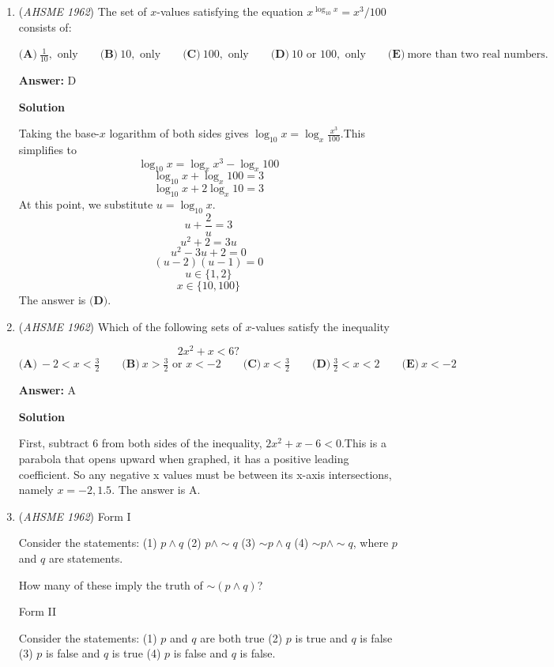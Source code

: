 \begin{enumerate}
 


	\item (\textit{AHSME 1962}) The set of $x$-values satisfying the equation $x^{\log_{10} x} = x^3/100$ consists of:


 $\textbf{(A)}\ \frac{1}{10},\text{ only} \qquad  \textbf{(B)}\ 10,\text{ only} \qquad  \textbf{(C)}\ 100,\text{ only} \qquad  \textbf{(D)}\ 10 \text{ or } 100,\text{ only} \qquad  \textbf{(E)}\ \text{more than two real numbers.}$

 \textbf{Answer: }D



\textbf{Solution}

Taking the base-$x$ logarithm of both sides gives $\log_{10}x=\log_x\frac{x^3}{100}$.This simplifies to 
 \[\log_{10}x=\log_x{x^3} - \log_x{100}\]
 \[\log_{10}x+\log_x{100}=3\]
 \[\log_{10}x+2 \log_x{10}=3\]At this point, we substitute $u=\log_{10}x$.
 \[u+\frac2u=3\]
 \[u^2+2=3u\]
 \[u^2-3u+2=0\]
 \[(u-2)(u-1)=0\]
 \[u\in\{1, 2\}\]
 \[x\in\{10, 100\}\]The answer is $\boxed{\textbf{(D)}}$.

 


	\item (\textit{AHSME 1962}) Which of the following sets of $x$-values satisfy the inequality

 \[2x^2 + x < 6?\]
$\textbf{(A)}\ -2 < x < \frac{3}{2} \qquad  \textbf{(B)}\ x > \frac{3}{2} \text{ or } x < -2 \qquad  \textbf{(C)}\ x < \frac{3}{2} \qquad  \textbf{(D)}\ \frac{3}{2} < x < 2 \qquad  \textbf{(E)}\ x < -2$

 \textbf{Answer: }A



\textbf{Solution}

First, subtract 6 from both sides of the inequality, $2x^2 + x - 6 < 0$.This is a parabola that opens upward when graphed, it has a positive leading coefficient. So any negative x values must be between its x-axis intersections, namely $x = -2, 1.5$. The answer is A.

 


	\item (\textit{AHSME 1962}) Form I


 Consider the statements: (1) $p \wedge q$ (2) $p \wedge \sim q$ (3) $\sim p \wedge q$ (4) $\sim p \wedge \sim q$, where $p$ and $q$ are statements.


 How many of these imply the truth of $\sim(p \wedge q)$?


 Form II


 Consider the statements: (1) $p$ and $q$ are both true (2) $p$ is true and $q$ is false (3) $p$ is false and $q$ is true (4) $p$ is false and $q$ is false.



\end{enumerate}
